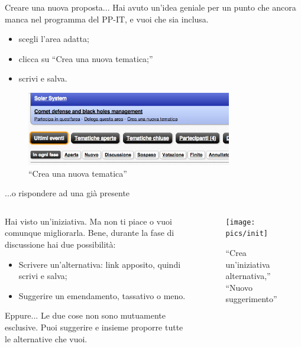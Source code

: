 \begin{frame}{Creare una nuova proposta... }
Hai avuto un'idea geniale per un punto che ancora manca nel programma del PP-IT, e vuoi che sia inclusa.
\begin{itemize}\item scegli l'area adatta;\item clicca su ``Crea una nuova tematica;''\item scrivi e salva.\end{itemize}
\begin{figure}\includegraphics[width=0.8\textwidth]{pics/partecipa}
\caption{``Crea una nuova tematica''}
\end{figure}
\end{frame}

\begin{frame}{...o rispondere ad una già presente}
\begin{columns}
\begin{column}{.5\textwidth}Hai visto un'iniziativa. Ma non ti piace o vuoi comunque migliorarla. Bene, durante la fase di discussione hai due possibilità:\begin{itemize}\item Scrivere un'alternativa: link apposito, quindi scrivi e salva; \item Suggerire un emendamento, tassativo o meno. \end{itemize}
\begin{block}{Eppure...}
Le due cose non sono mutuamente esclusive. Puoi suggerire e insieme proporre tutte le alternative che vuoi. 
\end{block}
\end{column}
\begin{column}{.5\textwidth}\begin{figure}\texttt{[image: pics/init]}
\caption{``Crea un'iniziativa alternativa,'' ``Nuovo suggerimento''}
\end{figure}\end{column}
\end{columns}
\end{frame}

